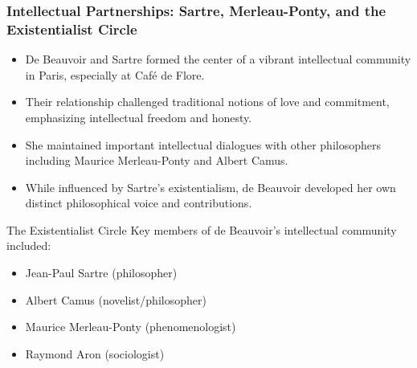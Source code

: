 \documentclass[aspectratio=169]{beamer}
\begin{document}
	\begin{frame}
		\frametitle{Intellectual Partnerships: Sartre, Merleau-Ponty, and the Existentialist Circle}
		\begin{itemize}
			\item De Beauvoir and Sartre formed the center of a vibrant intellectual community in Paris, especially at Café de Flore.
			\item Their relationship challenged traditional notions of love and commitment, emphasizing intellectual freedom and honesty.
			\item She maintained important intellectual dialogues with other philosophers including Maurice Merleau-Ponty and Albert Camus.
			\item While influenced by Sartre's existentialism, de Beauvoir developed her own distinct philosophical voice and contributions.
		\end{itemize}
		
		\begin{block}{The Existentialist Circle}
			\scriptsize
			Key members of de Beauvoir's intellectual community included:
			\begin{itemize}
				\item Jean-Paul Sartre (philosopher)
				\item Albert Camus (novelist/philosopher) 
				\item Maurice Merleau-Ponty (phenomenologist)
				\item Raymond Aron (sociologist)
			\end{itemize}
		\end{block}
	\end{frame}
	
\end{document}
